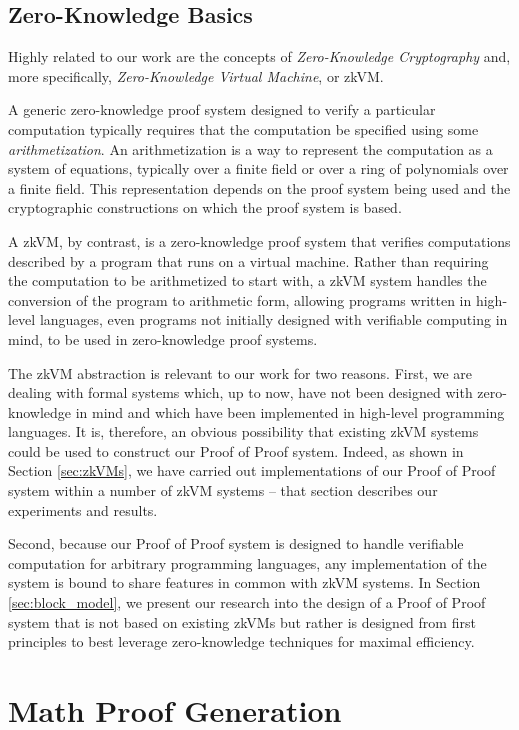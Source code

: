 \documentclass{article}
\theoremstyle{plain}
\theoremstyle{definition}
\begin{document}
\subsection{Zero-Knowledge Basics}

Highly related to our work are the concepts of \textit{Zero-Knowledge Cryptography} and, more specifically, \textit{Zero-Knowledge Virtual Machine}, or zkVM.

A generic zero-knowledge proof system designed to verify a particular computation typically requires that the computation be specified using some \textit{arithmetization}.  An arithmetization is a way to represent the computation as a system of equations, typically over a finite field or over a ring of polynomials over a finite field. This representation depends on the proof system being used and the cryptographic constructions on which the proof system is based.

A zkVM, by contrast, is a zero-knowledge proof system that verifies computations described by a program that runs on a virtual machine. Rather than requiring the computation to be arithmetized to start with, a zkVM system handles the conversion of the program to arithmetic form, allowing programs written in high-level languages, even programs not initially designed with verifiable computing in mind, to be used in zero-knowledge proof systems.

The zkVM abstraction is relevant to our work for two reasons. First, we are dealing with formal systems which, up to now, have not been designed with zero-knowledge in mind and which have been implemented in high-level programming languages. It is, therefore, an obvious possibility that existing zkVM systems could be used to construct our Proof of Proof system. Indeed, as shown in Section \ref{sec:zkVMs}, we have carried out implementations of our Proof of Proof system within a number of zkVM systems -- that section describes our experiments and results.

Second, because our Proof of Proof system is designed to handle verifiable computation for arbitrary programming languages, any implementation of the system is bound to share features in common with zkVM systems. In Section
\ref{sec:block_model}, we present our research into the design of a Proof of Proof system that is not based on existing zkVMs but rather is designed from first principles to best leverage zero-knowledge techniques for maximal efficiency.

\section{Math Proof Generation} \label{sec:mpg}
\end{document}
